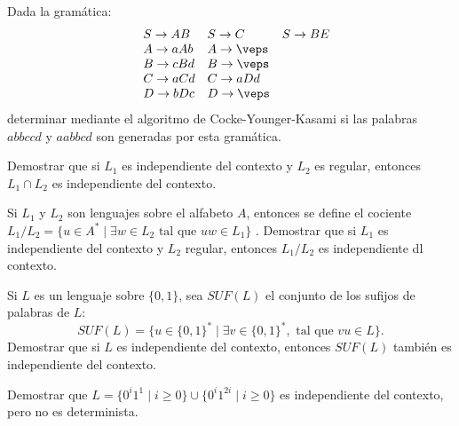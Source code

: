 \begin{ejercicio}\label{ej:1.6.15}
    Dada la gramática:
    \begin{equation*}
        \begin{array}{llll}
            &S\rightarrow AB &S\rightarrow C &S\rightarrow BE \\
            &A\rightarrow aAb &A\rightarrow \veps &\\
            &B\rightarrow cBd &B\rightarrow\veps & \\
            &C\rightarrow aCd &C\rightarrow aDd & \\
            &D\rightarrow bDc &D\rightarrow\veps & 
        \end{array}
    \end{equation*}
    determinar mediante el algoritmo de Cocke-Younger-Kasami si las palabras $abbccd$ y $aabbcd$ son generadas por esta gramática.
\end{ejercicio}

\begin{ejercicio}\label{ej:1.6.16}
    Demostrar que si $L_1$ es independiente del contexto y $L_2$ es regular, entonces $L_1\cap L_2$ es independiente del contexto.
\end{ejercicio}

\begin{ejercicio}\label{ej:1.6.17}
    Si $L_1$ y $L_2$ son lenguajes sobre el alfabeto $A$, entonces se define el cociente $L_1/L_2 = \{u\in A^\ast \mid \exists w\in L_2 \text{\ tal que\ } uw\in L_1\}$ . Demostrar que si $L_1$ es independiente del contexto y $L_2$ regular, entonces $L_1/L_2$ es independiente dl contexto.
\end{ejercicio}

\begin{ejercicio}\label{ej:1.6.18}
    Si $L$ es un lenguaje sobre $\{0,1\}$, sea $SUF(L)$ el conjunto de los sufijos de palabras de $L$: 
    \begin{equation*}
        SUF(L) = \{u\in {\{0,1\}}^{\ast} \mid \exists v\in {\{0,1\}}^{\ast}, \text{\ tal que\ } vu\in L\}.
    \end{equation*}
    Demostrar que si $L$ es independiente del contexto, entonces $SUF(L)$ también es independiente del contexto.
\end{ejercicio}

\begin{ejercicio}\label{ej:1.6.19}
    Demostrar que $L=\{0^i 1^1 \mid i\geq 0\} \cup \{0^i1^{2i} \mid i\geq 0\}$ es independiente del contexto, pero no es determinista.
\end{ejercicio}

